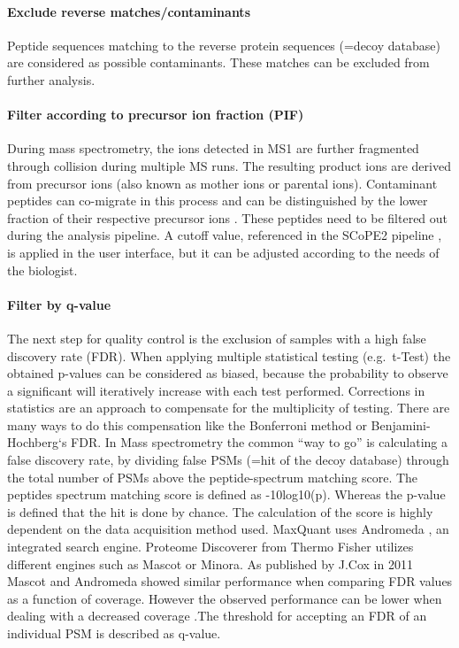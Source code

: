 \documentclass[
]{article}
\begin{document}
\hypertarget{exclude-reverse-matchescontaminants}{%
\paragraph{Exclude reverse
matches/contaminants}\label{exclude-reverse-matchescontaminants}}

Peptide sequences matching to the reverse protein sequences (=decoy
database) are considered as possible contaminants. These matches can be
excluded from further analysis.

\hypertarget{filter-according-to-precursor-ion-fraction-pif}{%
\paragraph{Filter according to precursor ion fraction
(PIF)}\label{filter-according-to-precursor-ion-fraction-pif}}

During mass spectrometry, the ions detected in MS1 are further
fragmented through collision during multiple MS runs. The resulting
product ions are derived from precursor ions (also known as mother ions
or parental ions). Contaminant peptides can co-migrate in this process
and can be distinguished by the lower fraction of their respective
precursor ions \citep{Tannous2020}. These peptides need to be filtered
out during the analysis pipeline. A cutoff value, referenced in the
SCoPE2 pipeline \citep{Specht2021}, is applied in the user interface,
but it can be adjusted according to the needs of the biologist.

\hypertarget{filter-by-q-value}{%
\paragraph{Filter by q-value}\label{filter-by-q-value}}

The next step for quality control is the exclusion of samples with a
high false discovery rate (FDR). When applying multiple statistical
testing (e.g.~t-Test) the obtained p-values can be considered as biased,
because the probability to observe a significant will iteratively
increase with each test performed. Corrections in statistics are an
approach to compensate for the multiplicity of testing. There are many
ways to do this compensation like the Bonferroni method or
Benjamini-Hochberg`s FDR. In Mass spectrometry the common ``way to go''
is calculating a false discovery rate, by dividing false PSMs (=hit of
the decoy database) through the total number of PSMs above the
peptide-spectrum matching score. The peptides spectrum matching score is
defined as -10log10(p). Whereas the p-value is defined that the hit is
done by chance. The calculation of the score is highly dependent on the
data acquisition method used. MaxQuant uses Andromeda , an integrated
search engine. Proteome Discoverer from Thermo Fisher utilizes different
engines such as Mascot or Minora. As published by J.Cox in 2011 Mascot
and Andromeda showed similar performance when comparing FDR values as a
function of coverage. However the observed performance can be lower when
dealing with a decreased coverage \citep{Cox2011}.The threshold for
accepting an FDR of an individual PSM is described as q-value.
\end{document}
